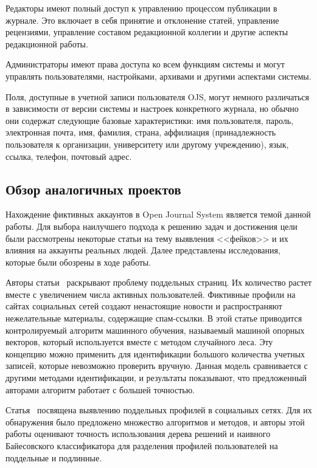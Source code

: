 Редакторы имеют полный доступ к управлению процессом публикации в журнале. Это включает в себя принятие и отклонение статей, управление рецензиями, управление составом редакционной коллегии и другие аспекты редакционной работы.

Администраторы имеют права доступа ко всем функциям системы и могут управлять пользователями, настройками, архивами и другими аспектами системы.

Поля, доступные в учетной записи пользователя OJS, могут немного различаться в зависимости от версии системы и настроек конкретного журнала, но обычно они содержат следующие базовые характеристики: имя пользователя, пароль, электронная почта, имя, фамилия, страна, аффилиация (принадлежность пользователя к организации, университету или другому учреждению), язык, ссылка, телефон, почтовый адрес.

\vspace{1.5em}
\subsection{Обзор аналогичных проектов}
\label{subsec:Variants}

Нахождение фиктивных аккаунтов в Open Journal System является темой данной работы. Для выбора наилучшего подхода к решению задач и достижения цели были рассмотрены некоторые статьи на тему выявления <<фейков>> и их влияния на аккаунты реальных людей. Далее представлены исследования, которые были обозрены в ходе работы.

Авторы статьи~\cite{HassanAA23} раскрывают проблему поддельных страниц. Их количество растет вместе с увеличением числа активных пользователей. Фиктивные профили на сайтах социальных сетей создают ненастоящие новости и распространяют нежелательные материалы, содержащие спам-ссылки. В этой статье приводится контролируемый алгоритм машинного обучения, называемый машиной опорных векторов, который используется вместе с методом случайного леса. Эту концепцию можно применить для идентификации большого количества учетных записей, которые невозможно проверить вручную. Данная модель сравнивается с другими методами идентификации, и результаты показывают, что предложенный авторами алгоритм работает с большей точностью. 

Статья~\cite{ElyusufiEK19} посвящена выявлению поддельных профилей в социальных сетях. Для их обнаружения было предложено множество алгоритмов и методов, и авторы этой работы оценивают точность использования дерева решений и наивного Байесовского классификатора для разделения профилей пользователей на поддельные и подлинные.

